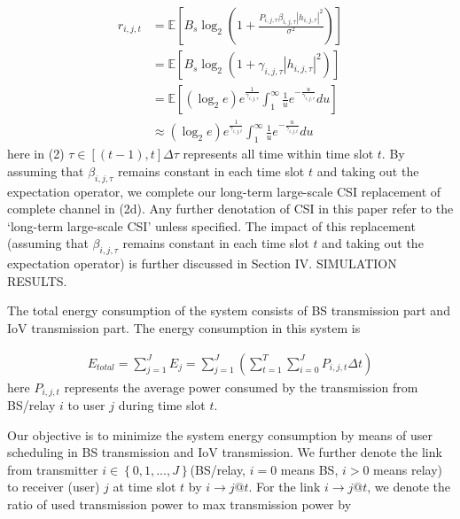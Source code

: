 \documentclass{ieeeaccess}
\begin{document}
\begin{subequations}
\begin{align}
{r_{i,j,t}} & = {\mathbb{E}}\left [ {{B_s}{{\log }_2}\left( {1 + \frac{{{P_{i,j,\tau }}{\beta _{i,j,\tau }}{{\left| {{h_{i,j,\tau }}} \right|}^2}}}{{{\sigma ^2}}}} \right)} \right ] \\
& = {\mathbb{E}}\left [  {B_s}{\log }_2 \left( {1 + {\gamma _{i,j,\tau }}{{\left| {{h_{i,j,\tau }}} \right|}^2}} \right)  \right ] \\
& = {\mathbb{E}}\left [  \left( {{{\log }_2}e} \right){e^{\frac{1}{{{\gamma _{i,j,\tau }}}}}}\int_1^\infty  {\frac{1}{u}{e^{ - \frac{u}{{{\gamma _{i,j,\tau }}}}}}du} \right ] \\
&  \approx \left( {{{\log }_2}e} \right){e^{\frac{1}{{{\gamma _{i,j,t}}}}}}\int_1^\infty  {\frac{1}{u}{e^{ - \frac{u}{{{\gamma _{i,j,t}}}}}}du}
\end{align}
\end{subequations}
here in (2) $\tau  \in \left[ {\left( {t - 1} \right),t} \right]\Delta \tau$ represents all time within time slot $t$. 
By assuming that $\beta _{i,j,\tau }$ remains constant in each time slot $t$ and taking out the expectation operator, we complete our long-term large-scale CSI replacement of complete channel in (2d). Any further denotation of CSI in this paper refer to the `long-term large-scale CSI' unless specified. The impact of this replacement (assuming that $\beta _{i,j,\tau }$ remains constant in each time slot $t$ and taking out the expectation operator) is further discussed in Section IV. SIMULATION RESULTS. 

The total energy consumption of the system consists of BS transmission part and IoV transmission part. The energy consumption in this system is

\begin{align}
{{E_{total}} = \sum\limits_{j = 1}^J {{E_j}}  = \sum\limits_{j = 1}^J {\left( {\sum\limits_{t = 1}^T {\sum\limits_{i = 0}^J {{P_{i,j,t}}\Delta t} } } \right)} }
\end{align}
here ${P_{i,j,t}}$ represents the average power consumed by the transmission from BS/relay $i$ to user $j$ during time slot $t$.

Our objective is to minimize the system energy consumption by means of user scheduling in BS transmission and IoV transmission. We further denote the link from transmitter $i \in \left\{ {0,1,...,J} \right\}$(BS/relay, $i = 0$ means BS, $i > 0$ means relay) to receiver (user) $j$ at time slot $t$ by $i \to j@t$. For the link $i \to j@t$, we denote the ratio of used transmission power to max transmission power by 
\end{document}
